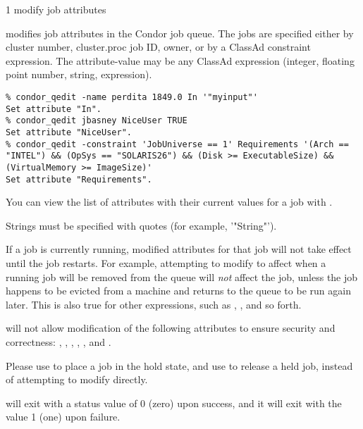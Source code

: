 \begin{ManPage}{\label{man-condor-qedit}}{1}
{modify job attributes}
\Synopsis {}
\Arg{\Dots}


\Description

 modifies job attributes in the Condor job queue.  The
jobs are specified either by cluster number, cluster.proc job ID,
owner, or by a ClassAd constraint expression.  The attribute-value may
be any ClassAd expression (integer, floating point number, string,
expression).

\begin{Options}
\end{Options}

\Examples
\begin{verbatim}
% condor_qedit -name perdita 1849.0 In '"myinput"'
Set attribute "In".
% condor_qedit jbasney NiceUser TRUE
Set attribute "NiceUser".
% condor_qedit -constraint 'JobUniverse == 1' Requirements '(Arch == "INTEL") && (OpSys == "SOLARIS26") && (Disk >= ExecutableSize) && (VirtualMemory >= ImageSize)'
Set attribute "Requirements".
\end{verbatim}

\GenRem
You can view the list of attributes with their current values for a
job with  .

Strings must be specified with quotes (for example, '"String"').

If a job is currently running, modified attributes for that job will not 
take effect until the job restarts.
For example, attempting to modify 
 to affect when a running job will be
removed from the queue 
will \emph{not} affect the job, unless the job happens to be 
evicted from a machine and returns to the queue to be run again later.
This is also true for other expressions, such as ,
, and so forth.

 will not allow modification of the following
attributes to ensure security and correctness: ,
, , , , and
.

Please use  to place a job in the hold state,
and use  to release a held job,
instead of attempting to modify  directly.

\ExitStatus

 will exit with a status value of 0 (zero) upon success,
and it will exit with the value 1 (one) upon failure.

\end{ManPage}
